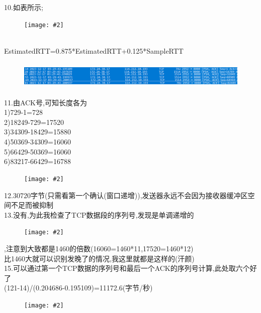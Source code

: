 \documentclass{article}
\newcommand{\displayimage}[2][width=\textwidth]{%
  \begin{figure}[htbp]
    \centering
    \texttt{[image: \#2]}
  \end{figure}
}
\begin{document}
10.如表所示;\displayimage{pic2/RTT.png}\\
EstimatedRTT=0.875*EstimatedRTT+0.125*SampleRTT\\
\begin{figure}[htbp]
  \centering
  \includegraphics[height=38pt]{pic2/1.0.png}
  \hspace{1cm} %
\end{figure}
\newpage
11.由ACK号,可知长度各为\\
  1)729-1=728\\
  2)18249-729=17520\\
  3)34309-18429=15880\\
  4)50369-34309=16060\\
  5)66429-50369=16060\\
  6)83217-66429=16788\\
\displayimage{pic2/len.png}

12.30720字节(只需看第一个确认(窗口递增)),发送器永远不会因为接收器缓冲区空间不足而被抑制\\
13.没有,为此我检查了TCP数据段的序列号,发现是单调递增的\\
\displayimage[height=200pt]{pic2/seq.png}
,注意到大致都是1460的倍数(16060=1460*11,17520=1460*12)\\
比1460大就可以识别发晚了的情况,我这里就都是这样的(汗颜)\\
15.可以通过第一个TCP数据的序列号和最后一个ACK的序列号计算,此处取六个好了\\
(121-14)/(0.204686-0.195109)=11172.6(字节/秒)
\displayimage[height=300pt]{pic2/v.png}
\end{document}
